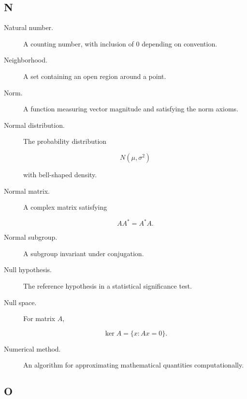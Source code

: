\subsection*{N}

\begin{description}

\item[Natural number.]
A counting number, with inclusion of \(0\) depending on convention.

\item[Neighborhood.]
A set containing an open region around a point.

\item[Norm.]
A function measuring vector magnitude and satisfying the norm axioms.

\item[Normal distribution.]
The probability distribution

\[
N(\mu,\sigma^2)
\]

with bell-shaped density.

\item[Normal matrix.]
A complex matrix satisfying

\[
AA^*
=
A^*A.
\]

\item[Normal subgroup.]
A subgroup invariant under conjugation.

\item[Null hypothesis.]
The reference hypothesis in a statistical significance test.

\item[Null space.]
For matrix \(A\),

\[
\ker A
=
\{x:Ax=0\}.
\]

\item[Numerical method.]
An algorithm for approximating mathematical quantities computationally.

\end{description}

\subsection*{O}

